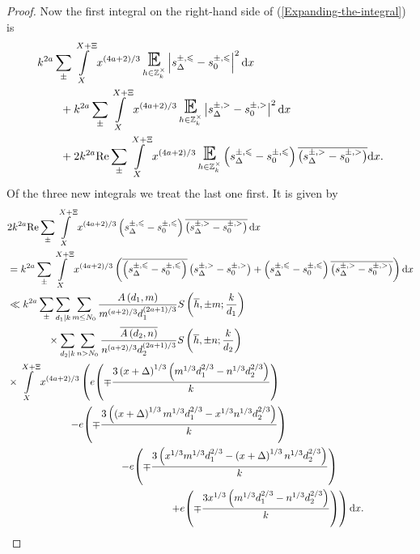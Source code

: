 \documentclass[a4paper,10pt,twoside]{amsart}
\theoremstyle{definition}
\numberwithin{equation}{section}
\newcommand\E{\mathbb{E}}
\renewcommand{\Re}{\textnormal{Re}}
\renewcommand\:{\colon}
\begin{document}
\begin{proof}
Now the first integral on the right-hand side of (\ref{Expanding-the-integral}) is
\begin{align}\label{Expanding-the-integral-2}
&k^{2a}\sum_\pm\int\limits_X^{X+\Xi}x^{(4a+2)/3}\mathop{\text{\LARGE$\E$}}_{h\in\mathbb Z_k^\times}\left|s_\Delta^{\pm,\leqslant}-s_0^{\pm,\leqslant}\right|^2\mathrm dx\\
&\qquad+k^{2a}\sum_\pm\int\limits_X^{X+\Xi}x^{(4a+2)/3}\mathop{\text{\LARGE$\E$}}_{h\in\mathbb Z_k^\times}\left|s_\Delta^{\pm,>}-s_0^{\pm,>}\right|^2\mathrm dx \nonumber\\
&\qquad+2k^{2a}\Re\sum_\pm\int\limits_X^{X+\Xi}x^{(4a+2)/3}\mathop{\text{\LARGE$\E$}}_{h\in\mathbb Z_k^\times}\left(s_\Delta^{\pm,\leqslant}-s_0^{\pm,\leqslant}\right)\overline{\left(s_\Delta^{\pm,>}-s_0^{\pm,>}\right)}\mathrm dx. \nonumber
\end{align}
Of the three new integrals we treat the last one first. It is given by
\begin{align*}
&2k^{2a}\Re\sum_\pm\int\limits_X^{X+\Xi}x^{(4a+2)/3}\left(s_\Delta^{\pm,\leqslant}-s_0^{\pm,\leqslant}\right)\overline{\left(s_\Delta^{\pm,>}-s_0^{\pm,>}\right)}\,\mathrm dx\\
&=k^{2a}\sum_\pm\int\limits_X^{X+\Xi}x^{(4a+2)/3}\left(\overline{\left(s_\Delta^{\pm,\leqslant}-s_0^{\pm,\leqslant}\right)}\left(s_\Delta^{\pm,>}-s_0^{\pm,>}\right)+\left(s_\Delta^{\pm,\leqslant}-s_0^{\pm,\leqslant}\right)\overline{\left(s_\Delta^{\pm,>}-s_0^{\pm,>}\right)}\right)\mathrm dx\\
&\ll k^{2a}\sum_\pm\sum_{d_1|k}\sum_{m\leq N_0}\frac{A\left(d_1,m\right)}{m^{(a+2)/3}d_1^{(2a+1)/3}}S\left(\overline h,\pm m;\frac k{d_1}\right)\\
&\qquad\qquad\times\sum_{d_2|k}\sum_{n> N_0}\frac{\overline{A\left(d_2,n\right)}}{n^{(a+2)/3}d_2^{(2a+1)/3}}S\left(\overline h,\pm n;\frac k{d_2}\right)\\
&\times\int\limits_X^{X+\Xi}x^{(4a+2)/3}\left(e\!\left(\mp\frac{3\left(x+\Delta\right)^{1/3}\left(m^{1/3}d_1^{2/3}-n^{1/3}d_2^{2/3}\right)}k\right) \right. \\
&\left. \qquad\qquad\qquad-e\!\left(\mp\frac{3\left(\left(x+\Delta\right)^{1/3}m^{1/3}d_1^{2/3}-x^{1/3}n^{1/3}d_2^{2/3}\right)}k\right)\right. \\ 
&\left.\qquad\qquad\qquad\qquad \qquad\quad-e\!\left(\mp\frac{3\left(x^{1/3}m^{1/3}d_1^{2/3}-\left(x+\Delta\right)^{1/3}n^{1/3}d_2^{2/3}\right)}k\right) \right. \\
&\left. \qquad\qquad\qquad\qquad\qquad\qquad\qquad\qquad+e\!\left(\mp\frac{3x^{1/3}\left(m^{1/3}d_1^{2/3}-n^{1/3}d_2^{2/3}\right)}k\right)\right)\mathrm d x.

\end{align*}
\end{proof}
\end{document}
